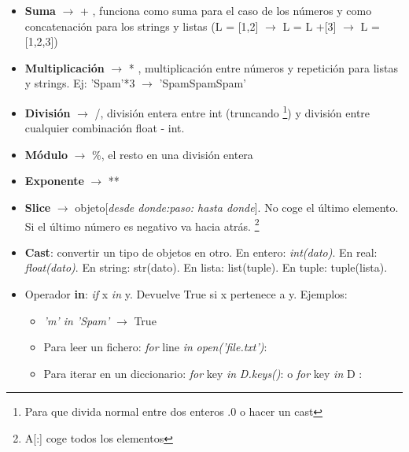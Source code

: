 	\begin{itemize}
	\item \textbf{Suma} $\rightarrow$ + , funciona como suma para el caso de los números y como concatenación para los strings y listas (L = [1,2] $\rightarrow$ L = L +[3] $\rightarrow$ L = [1,2,3])

	\item \textbf{Multiplicación} $\rightarrow$ * , multiplicación entre números y repetición para listas y strings. Ej: 'Spam'*3 $\rightarrow$ 'SpamSpamSpam'

	\item \textbf{División} $\rightarrow$ /, división entera entre int (truncando \footnote{Para que divida normal entre dos enteros .0 o hacer un cast}) y división entre cualquier combinación float - int.

	\item \textbf{Módulo} $\rightarrow$ \%, el resto en una división entera

	\item \textbf{Exponente} $\rightarrow$ **

	\item \textbf{Slice} $\rightarrow$ objeto[\textit{desde donde:paso: hasta donde}]. No coge el último elemento. Si el último número es negativo va hacia atrás. \footnote{A[:] coge todos los elementos}

	\item \textbf{Cast}: convertir un tipo de objetos en otro. En entero: \textit{int(dato)}. En real: \textit{float(dato)}. En string: str(dato). En lista: list(tuple). En tuple: tuple(lista). 

	\item Operador \textbf{in}: \textit{if} x \textit{in} y. Devuelve True si x pertenece a y. Ejemplos: 
		\begin{itemize}
		\item\textit{'m' in 'Spam'} $\rightarrow$ True
		\item Para leer un fichero: \textit{for} line \textit{in} \textit{open('file.txt')}:
		\item Para iterar en un diccionario: \textit{for} key \textit{in} \textit{D.keys()}: o \textit{for} key \textit{in} D :
		\end{itemize}
	\end{itemize}
